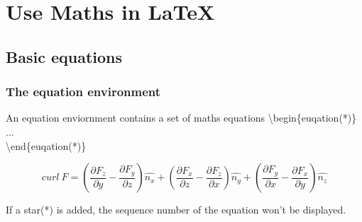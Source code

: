 \documentclass{beamer}
\begin{document}
\section{Use Maths in \LaTeX}
\begin{frame}
\end{frame}

\subsection{Basic equations}

\begin{frame}
	\frametitle{The equation environment}
	\begin{definition}
		An {\color{blue}equation} enviornment contains a set of maths equations
		{\color{red}\textbackslash begin\{euqation(*)\}}\\
		\quad ...\\
		{\color{red}\textbackslash end\{euqation(*)\}}\\
	\end{definition}
	\begin{example}
		\begin{equation}
		curl\ F=\left(\frac{\partial F_z}{\partial y}-\frac{\partial F_y}{\partial z}\right)\hat{n_x}+\left(\frac{\partial F_x}{\partial z}-\frac{\partial F_z}{\partial x}\right)\hat{n_y}+\left(\frac{\partial F_y}{\partial x}-\frac{\partial F_x}{\partial y}\right)\hat{n_z}
		\end{equation}
	\end{example}
	If a star({\color{blue}*}) is added, the sequence number of the equation won't be displayed.
\end{frame}
\end{document}
